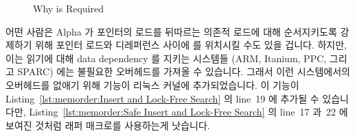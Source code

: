 \begin{figure}[tbp]
\centering
{}
\caption{Why  is Required}
\label{fig:memorder:Why smp-read-barrier-depends() is Required}
\end{figure}

어떤 사람은 Alpha 가 포인터의 로드를 뒤따르는 의존적 로드에 대해 순서지키도록
강제하기 위해 포인터 로드와 디레퍼런스 사이에  를 위치시킬 수도
있을 겁니다.
하지만, 이는 읽기에 대해 data dependency 를 지키는 시스템들 (ARM, Itanium, PPC,
그리고 SPARC) 에는 불필요한 오버헤드를 가져올 수 있습니다.
그래서 이런 시스템에서의 오버헤드를 없애기 위해 
기능이 리눅스 커널에 추가되었습니다.
이 기능이
Listing~\ref{lst:memorder:Insert and Lock-Free Search} 의 line~19 에 추가될 수
있습니다만,
Listing~\ref{lst:memorder:Safe Insert and Lock-Free Search} 의 line~17 과~22 에
보여진 것처럼  래퍼 매크로를 사용하는게 낫습니다.


